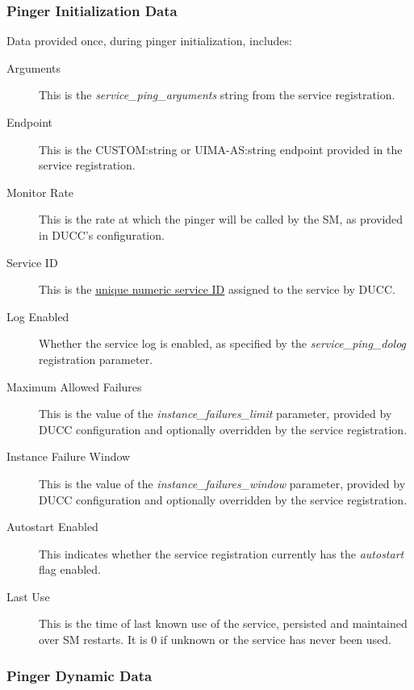       \subsubsection{Pinger Initialization Data}
      Data provided once, during pinger initialization, includes:
      \begin{description}
        \item[Arguments] This is the {\em service\_ping\_arguments} string from the
          service registration.
        \item[Endpoint] This is the CUSTOM:string or UIMA-AS:string endpoint provided
          in the service registration.
        \item[Monitor Rate] This is the rate at which the pinger will be called by
          the SM, as provided in DUCC's configuration.
        \item[Service ID] This is the \hyperref[sec:service.service.ids]{unique numeric service ID} assigned to the service
          by DUCC.
        \item[Log Enabled] Whether the service log is enabled, as specified by the
          {\em service\_ping\_dolog} registration parameter.
        \item[Maximum Allowed Failures] This is the value of the {\em instance\_failures\_limit}
          parameter, provided by DUCC configuration and optionally overridden by the
          service registration.
        \item[Instance Failure Window] This is the value of the {\em instance\_failures\_window}
          parameter, provided by DUCC configuration and optionally overridden by the
          service registration.
        \item[Autostart Enabled] This indicates whether the service registration currently
          has the {\em autostart} flag enabled.
        \item[Last Use] This is the time of last known use of the service, persisted and
          maintained over SM restarts.  It is 0 if unknown or the service has never been
              used.
      \end{description}
        
      \subsubsection{Pinger Dynamic Data}

